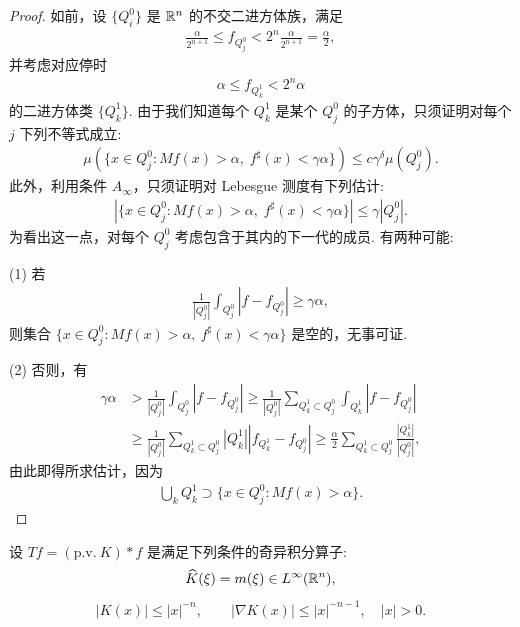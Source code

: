 \begin{proof}
如前，设 $\{Q_i^0\}$ 是 $\mathbb{R}^n$ 的不交二进方体族，满足
\begin{align*}
  \frac{\alpha}{2^{n+1}}\leq f_{Q_{j}^{0}}<2^{n}\frac{\alpha}{2^{n+1}}=\frac{\alpha}{2},
\end{align*}
并考虑对应停时
\begin{align*}
  \alpha\leq f_{Q_{k}^{1}}<2^{n}\alpha
\end{align*}
的二进方体类 $\{Q_k^1\}$. 由于我们知道每个 $Q_k^1$ 是某个 $Q_j^0$ 的子方体，只须证明对每个 $j$ 下列不等式成立:
\begin{align*}
  \mu(\{x\in Q_{j}^{0}:M f(x)>\alpha,\;f^{\sharp}(x)<\gamma\alpha\})
  \leq c\gamma^{\delta}\mu(Q_{j}^{0}).
\end{align*}
此外，利用条件 $A_{\infty}$，只须证明对 Lebesgue 测度有下列估计:
\begin{align*}
  |\{x\in Q_{j}^{0}:M f(x)>\alpha,\;f^{\sharp}(x)<\gamma\alpha\}|\leq\gamma|Q_{j}^{0}|.
\end{align*}
为看出这一点，对每个 $Q_j^0$ 考虑包含于其内的下一代的成员. 有两种可能:

(1) 若
\begin{align*}
  \frac{1}{\left|Q_{j}^{0}\right|}\int_{Q_{j}^{0}}\left|f-f_{Q_{j}^{0}}\right|\geq\gamma\alpha,
\end{align*}
则集合 $\{x \in Q_j^0 : M f(x) > \alpha,\ f^\sharp(x) < \gamma \alpha\}$ 是空的，无事可证.

(2) 否则，有
\begin{align*}
  \gamma\alpha
  &>\frac{1}{\left|Q_{j}^{0}\right|}\int_{Q_{j}^{0}}\left|f-f_{Q_{j}^{0}}\right|
  \geq\frac{1}{\left|Q_{j}^{0}\right|}\sum_{Q_{k}^{1}\subset Q_{j}^{0}}\int_{Q_{k}^{1}}\left|f-f_{Q_{j}^{0}}\right|\\
  &\geq\frac{1}{\left|Q_{j}^{0}\right|}\sum_{Q_{k}^{1}\subset Q_{j}^{0}}\left|Q_{k}^{1}\right|\left|f_{Q_{k}^{1}}-f_{Q_{j}^{0}}\right|
  \geq\frac{\alpha}{2}\sum_{Q_{k}^{1}\subset Q_{j}^{0}}\frac{\left|Q_{k}^{1}\right|}{\left|Q_{j}^{0}\right|},
\end{align*}
由此即得所求估计，因为
\begin{align*}
  \bigcup_{k}Q_{k}^{1}\supset\{x\in Q_{j}^{0}:M f(x)>\alpha\}.
\end{align*}
\end{proof}

设 $Tf = (\mathrm{p.v.}\ K) * f$ 是满足下列条件的奇异积分算子:
\begin{align*}
  \widehat{K}(\xi)=m(\xi)\in L^{\infty}(\mathbb{R}^{n}),
\end{align*}
\begin{align*}
  |K(x)|\leq|x|^{-n},\qquad |\nabla K(x)|\leq|x|^{-n-1},\quad |x|>0.
\end{align*}

